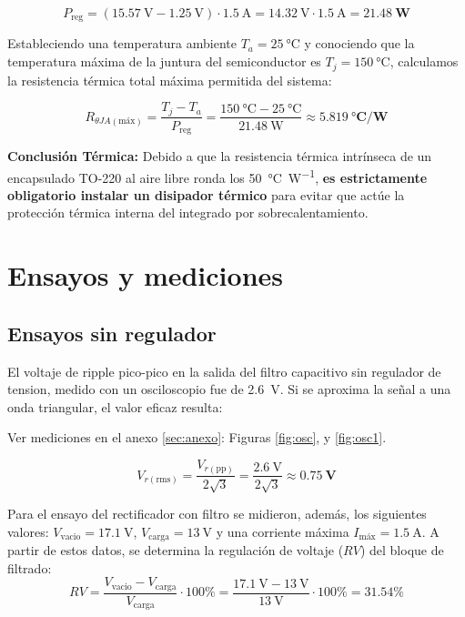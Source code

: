 \documentclass[12pt,a4paper]{article}
\begin{document}
\begin{equation}
    P_{\text{reg}} = (\SI{15.57}{\V} - \SI{1.25}{\V}) \cdot \SI{1.5}{\A} = \SI{14.32}{\V} \cdot \SI{1.5}{\A} = \mathbf{\SI{21.48}{\W}}
\end{equation}

Estableciendo una temperatura ambiente $T_a = \SI{25}{\celsius}$ y conociendo que la temperatura máxima de la juntura 
del semiconductor es $T_j = \SI{150}{\celsius}$, calculamos la resistencia térmica total máxima permitida del sistema:

\begin{equation}
    R_{\theta JA(\text{máx})} = \frac{T_j - T_a}{P_{\text{reg}}} = \frac{\SI{150}{\celsius} - \SI{25}{\celsius}}{\SI{21.48}{\W}} \approx \mathbf{\SI{5.819}{\celsius\per\W}}
\end{equation}

\textbf{Conclusión Térmica:} Debido a que la resistencia térmica intrínseca de un encapsulado TO-220 al aire libre ronda
los \SI{50}{\celsius\per\W}, \textbf{es estrictamente obligatorio instalar un disipador térmico} para evitar que actúe
la protección térmica interna del integrado por sobrecalentamiento.


\section{Ensayos y mediciones}
\subsection{Ensayos sin regulador}

El voltaje de ripple pico-pico en la salida del filtro capacitivo sin regulador de tension, medido con un osciloscopio fue de \SI{2.6}{\V}. Si se aproxima la señal a una onda triangular, el valor eficaz resulta: 

Ver mediciones en el anexo \ref{sec:anexo}: Figuras \ref{fig:osc}, y \ref{fig:osc1}.

\begin{equation}
    V_{r(\text{rms})} = \frac{V_{r(\text{pp})}}{2\sqrt{3}} = \frac{\SI{2.6}{\V}}{2\sqrt{3}} \approx \mathbf{\SI{0.75}{\V}}
\end{equation}

Para el ensayo del rectificador con filtro se midieron, además, los siguientes valores: $V_{\text{vacio}} = \SI{17.1}{\V}$, $V_{\text{carga}} = \SI{13}{\V}$ y una corriente máxima $I_{\text{máx}} = \SI{1.5}{\A}$. A partir de estos datos, se determina la regulación de voltaje ($RV$) del bloque de filtrado:
\begin{equation}
    RV = \frac{V_{\text{vacio}} - V_{\text{carga}}}{V_{\text{carga}}} \cdot 100\% = \frac{\SI{17.1}{\V} - \SI{13}{\V}}{\SI{13}{\V}} \cdot 100\% = \mathbf{31.54\%}
\end{equation}
\end{document}
